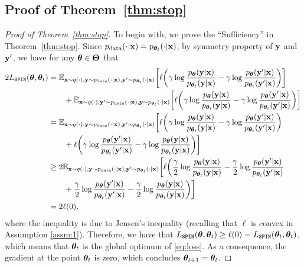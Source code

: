 \documentclass{article}
\newcommand{\method}{\texttt{SPIN}}
\begin{document}
\subsection{Proof of Theorem~\ref{thm:stop}}
\begin{proof}[Proof of Theorem~\ref{thm:stop}]
To begin with, we prove the ``Sufficiency'' in Theorem~\ref{thm:stop}. Since $p_{\mathrm{data}}(\cdot|\mathbf{x})= p_{\bm{\theta}_t}(\cdot|\mathbf{x})$, by symmetry property of $\mathbf{y}$ and $\mathbf{y}'$, we have for any $\bm{\theta} \in \bm{\Theta}$ that 
\begin{align*}
2L_{\method}(\btheta, \btheta_t) &= \EE_{\xb \sim q(\cdot), \yb \sim p_{\mathrm{data}}(\cdot|\xb), \yb' \sim p_{\btheta_t}(\cdot|\xb)}\bigg[\ell\bigg(\gamma \log \frac{p_{\btheta}(\yb | \xb)}{p_{\btheta_t}(\yb | \xb)}-\gamma \log \frac{p_{\btheta}(\yb' | \xb)}{p_{\btheta_t}(\yb' | \xb)}\bigg)\bigg] \\
&\qquad+ \EE_{\xb \sim q(\cdot), \yb' \sim p_{\mathrm{data}}(\cdot|\xb), \yb \sim p_{\btheta_t}(\cdot|\xb)}\bigg[\ell\bigg(\gamma \log \frac{p_{\btheta}(\yb | \xb)}{p_{\btheta_t}(\yb | \xb)}-\gamma \log \frac{p_{\btheta}(\yb' | \xb)}{p_{\btheta_t}(\yb' | \xb)}\bigg)\bigg]\\
&= \EE_{\xb \sim q(\cdot), \yb \sim p_{\mathrm{data}}(\cdot|\xb), \yb' \sim p_{\btheta_t}(\cdot|\xb)}\bigg[\ell\bigg(\gamma \log \frac{p_{\btheta}(\yb | \xb)}{p_{\btheta_t}(\yb | \xb)}-\gamma \log \frac{p_{\btheta}(\yb' | \xb)}{p_{\btheta_t}(\yb' | \xb)}\bigg)\\
&\qquad + \ell\bigg(\gamma \log \frac{p_{\btheta}(\yb' | \xb)}{p_{\btheta_t}(\yb' | \xb)}-\gamma \log \frac{p_{\btheta}(\yb | \xb)}{p_{\btheta_t}(\yb | \xb)}\bigg)\bigg]\\
&\geq 2\EE_{\xb \sim q(\cdot), \yb \sim p_{\mathrm{data}}(\cdot|\xb), \yb' \sim p_{\btheta_t}(\cdot|\xb)}\bigg[\ell\bigg(\frac{\gamma}{2} \log \frac{p_{\btheta}(\yb | \xb)}{p_{\btheta_t}(\yb | \xb)}-\frac{\gamma}{2}\log \frac{p_{\btheta}(\yb' | \xb)}{p_{\btheta_t}(\yb' | \xb)}\\
&\qquad + \frac{\gamma}{2} \log \frac{p_{\btheta}(\yb' | \xb)}{p_{\btheta_t}(\yb' | \xb)}-\frac{\gamma}{2} \log \frac{p_{\btheta}(\yb | \xb)}{p_{\btheta_t}(\yb | \xb)}\bigg)\bigg]\\
&= 2\ell(0),
\end{align*}
where the inequality is due to Jensen's inequality (recalling that $\ell$ is convex in Assumption \ref{assm:1}). Therefore, we have that $L_{\method}(\btheta, \btheta_t) \geq \ell(0) = L_{\method}(\btheta_t, \btheta_t)$, which means that $\bm{\theta}_t$ is the global optimum of \eqref{eq:loss}. As a consequence, the gradient at the point $\bm{\theta}_t$ is zero, which concludes $\bm{\theta}_{t+1} = \bm{\theta}_{t}$.  


\end{proof}
\end{document}

